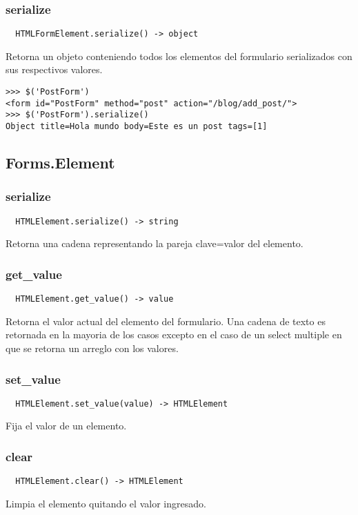 \subsubsection*{serialize}
\begin{verbatim}
  HTMLFormElement.serialize() -> object
\end{verbatim}
Retorna un objeto conteniendo todos los elementos del formulario serializados
con sus respectivos valores.

\begin{lstlisting}[style=consola]
>>> $('PostForm')
<form id="PostForm" method="post" action="/blog/add_post/">
>>> $('PostForm').serialize()
Object title=Hola mundo body=Este es un post tags=[1]
\end{lstlisting}

\subsection{Forms.Element}
\subsubsection*{serialize}
\begin{verbatim}
  HTMLElement.serialize() -> string
\end{verbatim}
Retorna una cadena representando la pareja clave=valor del elemento.

\subsubsection*{get\_value}
\begin{verbatim}
  HTMLElement.get_value() -> value
\end{verbatim}
Retorna el valor actual del elemento del formulario. Una cadena de texto es
retornada en la mayoria de los casos excepto en el caso de un select multiple en
que se retorna un arreglo con los valores.

\subsubsection*{set\_value}
\begin{verbatim}
  HTMLElement.set_value(value) -> HTMLElement
\end{verbatim}
Fija el valor de un elemento.

\subsubsection*{clear}
\begin{verbatim}
  HTMLElement.clear() -> HTMLElement
\end{verbatim}
Limpia el elemento quitando el valor ingresado.

